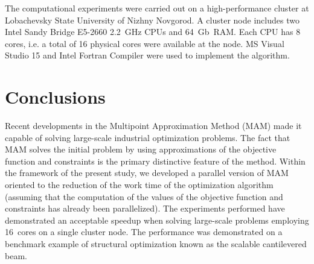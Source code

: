 \documentclass[runningheads,a4paper]{llncs}
\begin{document}
The computational experiments were carried out on a high-performance cluster at
Lobachevsky State University of Nizhny Novgorod. A cluster node includes two
Intel Sandy Bridge E5-2660 2.2~GHz CPUs and 64~Gb~RAM. Each CPU has 8 cores,
i.e. a total of 16 physical cores were available at the node. MS Visual Studio
15 and Intel Fortran Compiler were used to implement the algorithm.

\section{Conclusions}

Recent developments in the Multipoint Approximation Method (MAM) made it
capable of solving large-scale industrial optimization problems. The fact that
MAM solves the initial problem by using approximations of the objective
function and constraints is the primary distinctive feature of the method.
Within the framework of the present study, we developed a parallel version of
MAM oriented to the reduction of the work time of the optimization algorithm
(assuming that the computation of the values of the objective function and
constraints has already been parallelized). The experiments performed have
demonstrated an acceptable speedup when solving large-scale problems employing
16~cores on a single cluster node. The performance was demonstrated on a
benchmark example of structural optimization known as the scalable cantilevered
beam.
\end{document}
